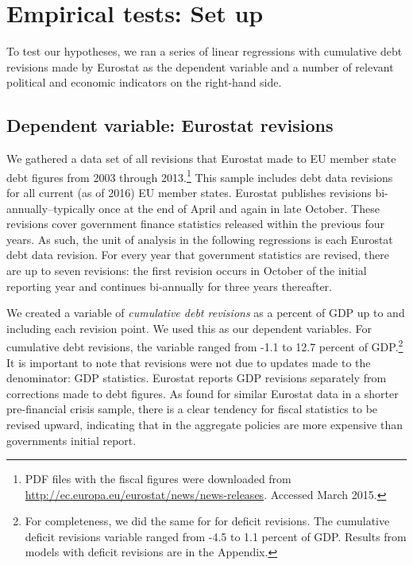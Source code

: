 \documentclass[]{article}
\begin{document}
\section{Empirical tests: Set up}

To test our hypotheses, we ran a series of linear regressions with cumulative debt revisions made by Eurostat as the dependent variable and a number of relevant political and economic indicators on the right-hand side.

\subsection{Dependent variable: Eurostat revisions}

We gathered a data set of all revisions that Eurostat made to EU member state debt figures from 2003 through 2013.\footnote{PDF files with the fiscal figures were downloaded from \url{http://ec.europa.eu/eurostat/news/news-releases}. Accessed March 2015.} This sample includes debt data revisions for all current (as of 2016) EU member states. Eurostat publishes revisions bi-annually--typically once at the end of April and again in late October. These revisions cover government finance statistics released within the previous four years. As such, the unit of analysis in the following regressions is each Eurostat debt data revision. For every year that government statistics are revised, there are up to seven revisions: the first revision occurs in October of the initial reporting year and continues bi-annually for three years thereafter.

We created a variable of \emph{cumulative debt revisions} as a percent of GDP up to and including each revision point. We used this as our dependent variables. For cumulative debt revisions, the variable ranged from -1.1 to 12.7 percent of GDP.\footnote{For completeness, we did the same for for deficit revisions. The cumulative deficit revisions variable ranged from -4.5 to 1.1 percent of GDP. Results from models with deficit revisions are in the Appendix.} It is important to note that revisions were not due to updates made to the denominator: GDP statistics. Eurostat reports GDP revisions separately from corrections made to debt figures. As \cite{DeCastro2013} found for similar Eurostat data in a shorter pre-financial crisis sample, there is a clear tendency for fiscal statistics to be revised upward, indicating that in the aggregate policies are more expensive than governments initial report.
\end{document}
